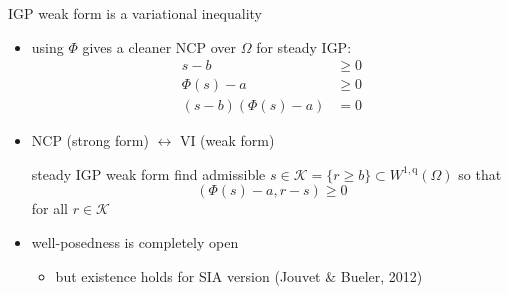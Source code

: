 \documentclass[usepdftitle=false,usenames,dvipsnames]{beamer}
\newcommand{\ip}[2]{\left(#1,#2\right)}
\newcommand{\qq}{{\text{q}}}
\begin{document}
\begin{frame}{IGP weak form is a variational inequality}

\begin{itemize}
\item using $\Phi$ gives a cleaner NCP over $\Omega$ for steady IGP:
\begin{align*}
s - b &\ge 0 \\
\Phi(s) - a &\ge 0 \\
(s - b) (\Phi(s) - a) &= 0
\end{align*}

\item NCP (strong form) $\leftrightarrow$ VI (weak form)

\begin{block}{steady IGP weak form}
find admissible $s \in \mathcal{K} = \{r \ge b\} \subset W^{1,\qq}(\Omega)$ so that
    $$\ip{\Phi(s)-a}{r-s} \ge 0$$
for all $r \in \mathcal{K}$
\end{block}

\item well-posedness is completely open
    \begin{itemize}
    \item but existence holds for SIA version (Jouvet \& Bueler, 2012)
    \end{itemize}

\end{itemize}
\end{frame}
\end{document}
